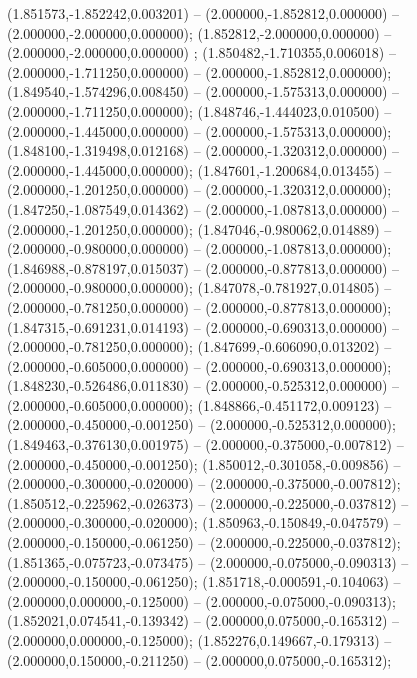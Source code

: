  (1.851573,-1.852242,0.003201) -- (2.000000,-1.852812,0.000000) -- (2.000000,-2.000000,0.000000);
 (1.852812,-2.000000,0.000000) -- (2.000000,-2.000000,0.000000) ;
 (1.850482,-1.710355,0.006018) -- (2.000000,-1.711250,0.000000) -- (2.000000,-1.852812,0.000000);
 (1.849540,-1.574296,0.008450) -- (2.000000,-1.575313,0.000000) -- (2.000000,-1.711250,0.000000);
 (1.848746,-1.444023,0.010500) -- (2.000000,-1.445000,0.000000) -- (2.000000,-1.575313,0.000000);
 (1.848100,-1.319498,0.012168) -- (2.000000,-1.320312,0.000000) -- (2.000000,-1.445000,0.000000);
 (1.847601,-1.200684,0.013455) -- (2.000000,-1.201250,0.000000) -- (2.000000,-1.320312,0.000000);
 (1.847250,-1.087549,0.014362) -- (2.000000,-1.087813,0.000000) -- (2.000000,-1.201250,0.000000);
 (1.847046,-0.980062,0.014889) -- (2.000000,-0.980000,0.000000) -- (2.000000,-1.087813,0.000000);
 (1.846988,-0.878197,0.015037) -- (2.000000,-0.877813,0.000000) -- (2.000000,-0.980000,0.000000);
 (1.847078,-0.781927,0.014805) -- (2.000000,-0.781250,0.000000) -- (2.000000,-0.877813,0.000000);
 (1.847315,-0.691231,0.014193) -- (2.000000,-0.690313,0.000000) -- (2.000000,-0.781250,0.000000);
 (1.847699,-0.606090,0.013202) -- (2.000000,-0.605000,0.000000) -- (2.000000,-0.690313,0.000000);
 (1.848230,-0.526486,0.011830) -- (2.000000,-0.525312,0.000000) -- (2.000000,-0.605000,0.000000);
 (1.848866,-0.451172,0.009123) -- (2.000000,-0.450000,-0.001250) -- (2.000000,-0.525312,0.000000);
 (1.849463,-0.376130,0.001975) -- (2.000000,-0.375000,-0.007812) -- (2.000000,-0.450000,-0.001250);
 (1.850012,-0.301058,-0.009856) -- (2.000000,-0.300000,-0.020000) -- (2.000000,-0.375000,-0.007812);
 (1.850512,-0.225962,-0.026373) -- (2.000000,-0.225000,-0.037812) -- (2.000000,-0.300000,-0.020000);
 (1.850963,-0.150849,-0.047579) -- (2.000000,-0.150000,-0.061250) -- (2.000000,-0.225000,-0.037812);
 (1.851365,-0.075723,-0.073475) -- (2.000000,-0.075000,-0.090313) -- (2.000000,-0.150000,-0.061250);
 (1.851718,-0.000591,-0.104063) -- (2.000000,0.000000,-0.125000) -- (2.000000,-0.075000,-0.090313);
 (1.852021,0.074541,-0.139342) -- (2.000000,0.075000,-0.165312) -- (2.000000,0.000000,-0.125000);
 (1.852276,0.149667,-0.179313) -- (2.000000,0.150000,-0.211250) -- (2.000000,0.075000,-0.165312);
